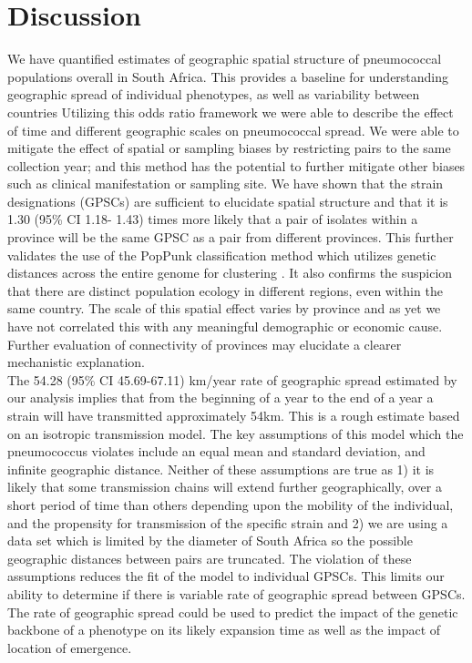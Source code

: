\documentclass{article}
\begin{document}
\section{Discussion}
We have quantified estimates of geographic spatial structure of pneumococcal populations overall in South Africa. This provides a baseline for understanding geographic spread of individual phenotypes, as well as variability between countries Utilizing this odds ratio framework we were able to describe the effect of time and different geographic scales on pneumococcal spread.  We were able to mitigate the effect of spatial or sampling biases by restricting pairs to the same collection year; and this method has the potential to further mitigate other biases such as clinical manifestation or sampling site. We have shown that the strain designations (GPSCs) are sufficient to elucidate spatial structure and that it is 1.30 (95\% CI 1.18- 1.43) times more likely that a pair of isolates within a province will be the same GPSC as a pair from different provinces. This further validates the use of the PopPunk classification method which utilizes genetic distances across the entire genome for clustering \cite{leesFastFlexibleBacterial2019}. It also confirms the suspicion that there are distinct population ecology in different regions, even within the same country. The scale of this spatial effect varies by province and as yet we have not correlated this with any meaningful demographic or economic cause. Further evaluation of connectivity of provinces may elucidate a clearer mechanistic explanation. 
 \\The 54.28 (95\% CI 45.69-67.11) km/year rate of geographic spread estimated by our analysis implies that from the beginning of a year to the end of a year a strain will have transmitted approximately 54km. This is a rough estimate based on an isotropic transmission model. The key assumptions of this model which the pneumococcus violates include an equal mean and standard deviation, and infinite geographic distance. Neither of these assumptions are true as 1) it is likely that some transmission chains will extend further geographically, over a short period of time than others depending upon the mobility of the individual, and the propensity for transmission of the specific strain and 2) we are using a data set which is limited by the diameter of South Africa so the possible geographic distances between pairs are truncated. The violation of these assumptions reduces the fit of the model to individual GPSCs. This limits our ability to determine if there is variable rate of geographic spread between GPSCs. The rate of geographic spread could be used to predict the impact of the genetic backbone of a phenotype on its likely expansion time as well as the impact of location of emergence.
\end{document}
